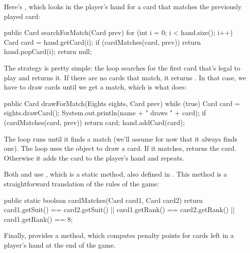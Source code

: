 
Here's , which looks in the player's hand for a card that matches the previously played card:

\begin{code}
public Card searchForMatch(Card prev) {
    for (int i = 0; i < hand.size(); i++) {
        Card card = hand.getCard(i);
        if (cardMatches(card, prev)) {
            return hand.popCard(i);
        }
    }
    return null;
}
\end{code}

The strategy is pretty simple: the  loop searches for the first card that's legal to play and returns it.
If there are no cards that match, it returns .
In that case, we have to draw cards until we get a match, which is what  does:

\begin{code}
public Card drawForMatch(Eights eights, Card prev) {
    while (true) {
        Card card = eights.drawCard();
        System.out.println(name + " draws " + card);
        if (cardMatches(card, prev)) {
            return card;
        }
        hand.addCard(card);
    }
}
\end{code}

The  loop runs until it finds a match (we'll assume for now that it always finds one).
The loop uses the  object to draw a card.
If it matches,  returns the card.
Otherwise it adds the card to the player's hand and repeats.

Both  and  use , which is a static method, also defined in .
This method is a straightforward translation of the rules of the game:

\begin{code}
public static boolean cardMatches(Card card1, Card card2) {
    return card1.getSuit() == card2.getSuit()
        || card1.getRank() == card2.getRank()
        || card1.getRank() == 8;
}
\end{code}

Finally,  provides a  method, which computes penalty points for cards left in a player's hand at the end of the game.



